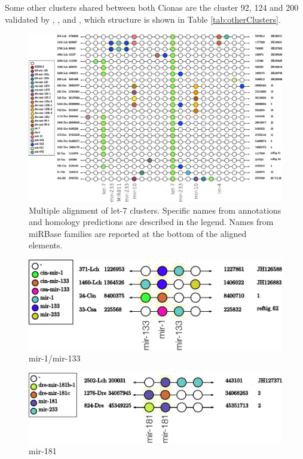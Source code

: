 \documentclass[graybox]{svmult}
\begin{document}
Some other clusters shared between both Cionas are the cluster 92, 124 and
200 validated by \citet{Norden-Krichmar2007}, \citet{Fu:08}, and
\citet{Hendrix2010}, which structure is shown in Table \ref{tab:otherClusters}.


\begin{figure}[ht!]
\sidecaption[t]
\includegraphics[width=\textwidth]{./Images/Cluster_images/let-7_101_128}
\caption{Multiple alignment of let-7 clusters. Specific names from annotations 
and homology predictions are described in the legend. Names from miRBase 
families are reported at the bottom of the aligned elements.} 
\label{fig:let-7}
\end{figure}

\begin{figure}[ht!]
\sidecaption[t]
\includegraphics[width=\textwidth]{./Images/Cluster_images/mir-133_113_33}
\caption{mir-1/mir-133}
\label{fig:mir-1}
\end{figure}

\begin{figure}[ht!]
\sidecaption[t]
\includegraphics[width=\textwidth]{./Images/Cluster_images/mir-181_105_2502}
\caption{mir-181}
\label{fig:mir-181}
\end{figure}
\end{document}
